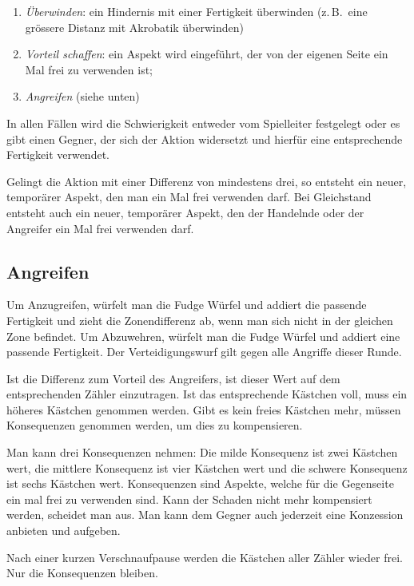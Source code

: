 \documentclass{tufte-handout}
\begin{document}
\begin{enumerate}
\item \textit{Überwinden}: ein Hindernis mit einer Fertigkeit
  überwinden (z.\,B.~eine grössere Distanz mit Akrobatik überwinden)
\item \textit{Vorteil schaffen}: ein Aspekt wird eingeführt, der
  von der eigenen Seite ein Mal frei zu verwenden ist; 
\item \textit{Angreifen} (siehe unten)
\end{enumerate}

\noindent In allen Fällen wird die Schwierigkeit entweder vom
Spielleiter festgelegt oder es gibt einen Gegner, der sich der Aktion
widersetzt und hierfür eine entsprechende Fertigkeit verwendet.

Gelingt die Aktion mit einer Differenz von mindestens drei, so
entsteht ein neuer, temporärer Aspekt, den man ein Mal frei verwenden
darf. Bei Gleichstand entsteht auch ein neuer, temporärer Aspekt, den
der Handelnde oder der Angreifer ein Mal frei verwenden darf.


\subsection{Angreifen}

Um Anzugreifen, würfelt man die Fudge Würfel und addiert die passende
Fertigkeit und zieht die Zonendifferenz ab, wenn man sich nicht in der
gleichen Zone befindet. Um Abzuwehren, würfelt man die Fudge Würfel
und addiert eine passende Fertigkeit. Der Verteidigungswurf gilt gegen
alle Angriffe dieser Runde.

Ist die Differenz zum Vorteil des Angreifers, ist dieser Wert auf dem
entsprechenden Zähler einzutragen. Ist das entsprechende Kästchen
voll, muss ein höheres Kästchen genommen werden. Gibt es kein freies
Kästchen mehr, müssen Konsequenzen genommen werden, um dies zu
kompensieren.

Man kann drei Konsequenzen nehmen: Die milde Konsequenz ist zwei
Kästchen wert, die mittlere Konsequenz ist vier Kästchen wert und die
schwere Konsequenz ist sechs Kästchen wert. Konsequenzen sind Aspekte,
welche für die Gegenseite ein mal frei zu verwenden sind. Kann der
Schaden nicht mehr kompensiert werden, scheidet man aus. Man kann dem
Gegner auch jederzeit eine Konzession anbieten und aufgeben.

Nach einer kurzen Verschnaufpause werden die Kästchen aller Zähler
wieder frei. Nur die Konsequenzen bleiben.
\end{document}
